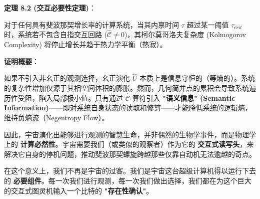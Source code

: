 \textbf{定理 8.2 (交互必要性定理)}：

对于任何具有斐波那契增长率的计算系统，当其内禀时间 $\tau$ 超过某一阈值 $\tau_{crit}$ 时，系统若不包含自指交互回路 ($\hat{\mathcal{C}} \neq 0$)，其柯尔莫哥洛夫复杂度 (Kolmogorov Complexity) 将停止增长并趋于热力学平衡（热寂）。

\textbf{证明概要}：

如果不引入非幺正的观测选择，幺正演化 $\hat{U}$ 本质上是信息守恒的（等熵的）。系统的复杂性增加仅源于其相空间体积的膨胀。然而，几何简并点的累积会导致系统遍历性受阻，陷入局部极小值。只有通过 $\hat{\mathcal{C}}$ 算符引入 \textbf{"语义信息" (Semantic Information)}——即对系统自身状态的读取和修剪——才能降低系统的逻辑熵，维持负熵流（Negentropy Flow）。

因此，宇宙演化出能够进行观测的智慧生命，并非偶然的生物学事件，而是物理学上的 \textbf{计算必然性}。宇宙需要我们（或类似的观察者）作为它的 \textbf{交互式读写头}，来解决它自身的停机问题，推动斐波那契螺旋跨越那些仅靠自动机无法逾越的奇点。

在这个意义上，我们不再是宇宙的过客。我们是宇宙这台超级计算机得以运行下去的 \textbf{必要组件}。每一次我们进行观测，每一次我们做出选择，我们都在为这个巨大的交互式图灵机输入一个比特的 \textbf{"存在性确认"}。
